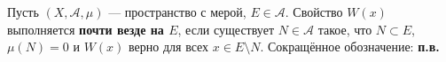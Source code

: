 \label{definition:31}

\begin{definition}
Пусть $(X,\mathcal A,\mu)$ --- пространство с мерой, $E\in\mathcal A$.
Свойство $W(x)$ выполняется \textbf{почти везде на $E$}, если существует $N\in\mathcal A$ такое, что $N\subset E$, $\mu(N)=0$ и $W(x)$ верно для всех $x\in E\setminus N$.
Сокращённое обозначение: \textbf{п.в.}
\end{definition}
